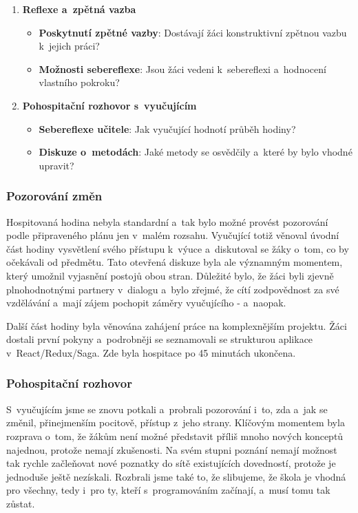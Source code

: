 \begin{enumerate}
    \item \textbf{Reflexe a~zpětná vazba}
    \begin{itemize}
        \item \textbf{Poskytnutí zpětné vazby}: Dostávají žáci konstruktivní zpětnou vazbu k~jejich práci?
        \item \textbf{Možnosti sebereflexe}: Jsou žáci vedeni k~sebereflexi a~hodnocení vlastního pokroku?
    \end{itemize}

    \item \textbf{Pohospitační rozhovor s~vyučujícím}
    \begin{itemize}
        \item \textbf{Sebereflexe učitele}: Jak vyučující hodnotí průběh hodiny?
        \item \textbf{Diskuze o~metodách}: Jaké metody se osvědčily a~které by bylo vhodné upravit?
    \end{itemize}

\end{enumerate}

\subsubsection*{Pozorování změn}

Hospitovaná hodina nebyla standardní a~tak bylo možné provést pozorování podle připraveného plánu jen v~malém rozsahu. Vyučující totiž věnoval úvodní část hodiny vysvětlení svého přístupu k~výuce a~diskutoval se žáky o~tom, co by očekávali od předmětu. Tato otevřená diskuze byla ale významným momentem, který umožnil vyjasnění postojů obou stran. Důležité bylo, že žáci byli zjevně plnohodnotnými partnery v~dialogu a~bylo zřejmé, že cítí zodpovědnost za své vzdělávání a~mají zájem pochopit záměry vyučujícího - a~naopak.

Další část hodiny byla věnována zahájení práce na komplexnějším projektu. Žáci dostali první pokyny a~podrobněji se seznamovali se strukturou aplikace v~React/Redux/Saga. Zde byla hospitace po 45 minutách ukončena.

\subsubsection*{Pohospitační rozhovor}

S~vyučujícím jsme se znovu potkali a~probrali pozorování i~to, zda a~jak se změnil, přinejmenším pocitově,  přístup z~jeho strany. Klíčovým momentem byla rozprava o~tom, že žákům není možné představit příliš mnoho nových konceptů najednou, protože nemají zkušenosti. Na svém stupni poznání nemají možnost tak rychle začleňovat nové poznatky do sítě existujících dovedností, protože je jednoduše ještě nezískali. Rozbrali jsme také to, že slibujeme, že škola je vhodná pro všechny, tedy i~pro ty, kteří s~programováním začínají, a~musí tomu tak zůstat. 

